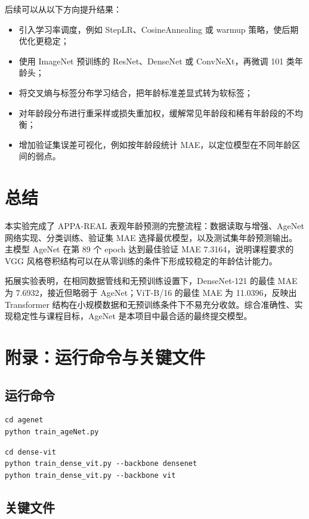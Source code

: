 \documentclass[12pt,a4paper,fontset=fandol]{ctexart}
\begin{document}
后续可以从以下方向提升结果：
\begin{itemize}
  \item 引入学习率调度，例如 StepLR、CosineAnnealing 或 warmup 策略，使后期优化更稳定；
  \item 使用 ImageNet 预训练的 ResNet、DenseNet 或 ConvNeXt，再微调 101 类年龄头；
  \item 将交叉熵与标签分布学习结合，把年龄标准差显式转为软标签；
  \item 对年龄段分布进行重采样或损失重加权，缓解常见年龄段和稀有年龄段的不均衡；
  \item 增加验证集误差可视化，例如按年龄段统计 MAE，以定位模型在不同年龄区间的弱点。
\end{itemize}

\section{总结}

本实验完成了 APPA-REAL 表观年龄预测的完整流程：数据读取与增强、AgeNet 网络实现、分类训练、验证集 MAE 选择最优模型，以及测试集年龄预测输出。主模型 AgeNet 在第 89 个 epoch 达到最佳验证 MAE 7.3164，说明课程要求的 VGG 风格卷积结构可以在从零训练的条件下形成较稳定的年龄估计能力。

拓展实验表明，在相同数据管线和无预训练设置下，DenseNet-121 的最佳 MAE 为 7.6932，接近但略弱于 AgeNet；ViT-B/16 的最佳 MAE 为 11.0396，反映出 Transformer 结构在小规模数据和无预训练条件下不易充分收敛。综合准确性、实现稳定性与课程目标，AgeNet 是本项目中最合适的最终提交模型。

\section{附录：运行命令与关键文件}

\subsection{运行命令}

\begin{lstlisting}[caption={AgeNet 训练与测试}]
cd agenet
python train_ageNet.py
\end{lstlisting}

\begin{lstlisting}[caption={DenseNet 与 ViT 拓展实验}]
cd dense-vit
python train_dense_vit.py --backbone densenet
python train_dense_vit.py --backbone vit
\end{lstlisting}

\subsection{关键文件}
\end{document}
